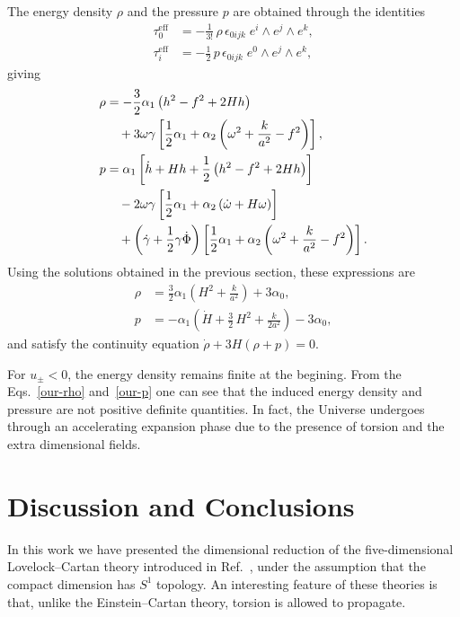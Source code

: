 \documentclass[aps,prd,12pt,superscriptaddress,showpacs,showkeys,longbibliography,reprint,nofootinbib]{revtex4-1}
\begin{document}
The energy density $\rho$ and the pressure $p$ are obtained through the identities
\begin{align}
  \tau_0^{\mathrm{eff}} &= -\frac{1}{3!} \, \rho \, \epsilon_{0ijk} \; e^i\wedge e^j\wedge e^k,\\
  \tau_i^{\mathrm{eff}} &= -\frac{1}{2} \,p \, \epsilon_{0ijk} \; e^0\wedge e^j\wedge e^k,
\end{align} 
giving
\begin{align}
  \label{rho}
  \rho &= -\frac{3}{2}\alpha_1\left(h^2-f^2+2Hh\right) \\
  & \quad + 3\omega\gamma\left[\frac{1}{2}\alpha_1+\alpha_2\left(\omega^2+\frac{k}{a^2}-f^2\right)\right], \notag
  \\
  \label{presion}
  p &= \alpha_1\left[\dot{h}+Hh+\frac{1}{2}\left(h^2-f^2+2Hh\right)\right]\\
  & \quad - 2\omega\gamma\left[\frac{1}{2}\alpha_1+\alpha_2\left(\dot{\omega}+H\omega\right)\right]\notag\\
  & \quad +\left(\dot{\gamma}+\frac{1}{2}\gamma\dot{\Phi}\right)\left[\frac{1}{2}\alpha_1+\alpha_2\left(\omega^2+\frac{k}{a^2}-f^2\right)\right]. \notag
\end{align}
Using the solutions obtained in the previous section, these expressions are
\begin{align}
  \label{our-rho}
  \rho &= \frac{3}{2}\alpha_1\left(H^2 + \frac{k}{a^2}\right) + 3\alpha_0, \\
  \label{our-p}
  p &= -\alpha_1\left(\dot{H} + \frac{3}{2}\,H^2 + \frac{k}{2a^2}\right) - 3\alpha_0,
\end{align}
and satisfy the continuity equation $\dot{\rho}+3H\left(\rho+p\right)=0$. 

For $u_\pm<0$, the energy density remains finite at the begining. From the Eqs.~\eqref{our-rho} and~\eqref{our-p} one can see that the induced energy density and pressure are not positive definite quantities. In fact, the Universe undergoes through an accelerating expansion phase due to the presence of torsion and the extra dimensional fields. 


\section{Discussion and Conclusions\label{conclusions}}

In this work we have presented the dimensional reduction of the five-dimensional Lovelock--Cartan theory introduced in Ref.~\cite{Mardones:1990qc}, under the assumption that the compact dimension has $S^1$ topology. An interesting feature of these theories is that, unlike the Einstein--Cartan theory, torsion is allowed to propagate.
\end{document}
